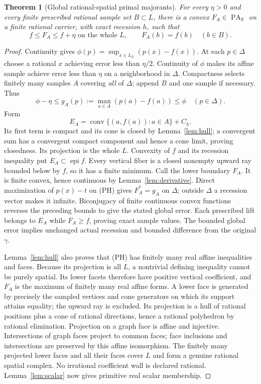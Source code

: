 \documentclass[11pt]{article}
\newtheorem{theorem}{Theorem}[section]
\newcommand{\R}{\mathbb R}
\newcommand{\Q}{\mathbb Q}
\newcommand{\PA}{\operatorname{PA}}
\newcommand{\epi}{\operatorname{epi}}
\newcommand{\conv}{\operatorname{conv}}
\begin{document}
\begin{theorem}[Global rational-spatial primal majorants]\label{thm:primal}
For every $\eta>0$ and every finite prescribed rational sample set $B\subset L$, there is a convex $F_A\in\PA_\R$ on a finite rational carrier, with exact recession $h$, such that
\[
 f\leq F_A\leq f+\eta\text{ on the whole }L,\qquad F_A(b)=f(b)\quad(b\in B).
\]
\end{theorem}
\begin{proof}
Continuity gives $\phi(p)=\sup_{x\in L_\Q}(p(x)-f(x))$. At each $p\in\Delta$ choose a rational $x$ achieving error less than $\eta/2$. Continuity of $\phi$ makes its affine sample achieve error less than $\eta$ on a neighborhood in $\Delta$. Compactness selects finitely many samples $A$ covering \emph{all} of $\Delta$; append $B$ and one sample if necessary. Thus
\[
 \phi-\eta\leq g_A(p):=\max_{a\in A}(p(a)-f(a))\leq\phi\quad(p\in\Delta).
\]
Form
\[
 E_A=\conv\{(a,f(a)):a\in A\}+C_h.                                      \tag{PH}
\]
Its first term is compact and its cone is closed by Lemma~\ref{lem:hull}; a convergent sum has a convergent compact component and hence a cone limit, proving closedness. Its projection is the whole $L$. Convexity of $f$ and its recession inequality put $E_A\subset\epi f$. Every vertical fiber is a closed nonempty upward ray bounded below by $f$, so it has a finite minimum. Call the lower boundary $F_A$. It is finite convex, hence continuous by Lemma~\ref{lem:derivative}. Direct maximization of $p(x)-t$ on (PH) gives $F_A^*=g_A$ on $\Delta$; outside $\Delta$ a recession vector makes it infinite. Biconjugacy of finite continuous convex functions reverses the preceding bounds to give the stated global error. Each prescribed lift belongs to $E_A$ while $F_A\geq f$, proving exact sample values. The bounded global error implies unchanged actual recession and bounded difference from the original $\gamma$.

Lemma~\ref{lem:hull} also proves that (PH) has finitely many real affine inequalities and faces. Because its projection is all $L$, a nontrivial defining inequality cannot be purely spatial. Its lower facets therefore have positive vertical coefficient, and $F_A$ is the maximum of finitely many real affine forms. A lower face is generated by precisely the sampled vertices and cone generators on which its support attains equality; the upward ray is excluded. Its projection is a hull of rational positions plus a cone of rational directions, hence a rational polyhedron by rational elimination. Projection on a graph face is affine and injective. Intersections of graph faces project to common faces; face inclusions and intersections are preserved by this affine isomorphism. The finitely many projected lower faces and all their faces cover $L$ and form a genuine rational spatial complex. No irrational coefficient wall is declared rational. Lemma~\ref{lem:scalar} now gives primitive real scalar membership.
\end{proof}
\end{document}
